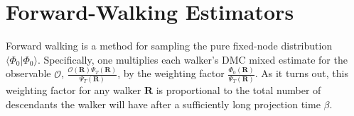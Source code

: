 %
%    
% 
%    
%    


\section{Forward-Walking Estimators} \label{sec:forward_walking}
Forward walking is a method for sampling the pure fixed-node distribution $\langle \Phi_0 | \Phi_0\rangle$.  Specifically, one multiplies each walker's DMC mixed estimate for the observable $\mathcal{O}$, $\frac{\mathcal{O}(\mathbf{R})\Psi_T(\mathbf{R})}{\Psi_T(\mathbf{R})}$, by the weighting factor $\frac{\Phi_0(\mathbf{R})}{\Psi_T(\mathbf{R})}$.  As it turns out, this weighting factor for any walker $\mathbf{R}$ is proportional to the total number of descendants the walker will have after a sufficiently long projection time $\beta$.  

